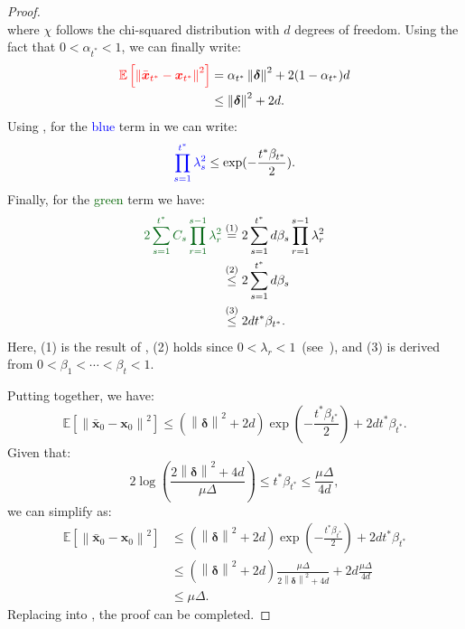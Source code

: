 \documentclass[conference]{IEEEtran}
\theoremstyle{definition}
\theoremstyle{remark}
\theoremstyle{proposition}
\newcommand{\norm}[1]{\left\lVert#1\right\rVert}
\begin{document}
\begin{proof}
$$    $$
    where $\chi$ follows the chi-squared distribution with $d$ degrees of freedom.
    Using the fact that $0 < \alpha_{t^{*}} < 1$, we can finally write:
    \begin{align}\label{eq:red_term_final}\nonumber
        \textcolor{red}{\mathbb{E}\left[\norm{\bar{\boldsymbol{x}}_{t^{*}}-\boldsymbol{x}_{t^{*}}}^2\right]}
        &= \alpha_{t^{*}}\norm{\boldsymbol{\delta}}^2 + 2 (1 - \alpha_{t^{*}})d \\ 
        &\leq \norm{\boldsymbol{\delta}}^2 + 2d.
    \end{align}
    Using , for the \textcolor{blue}{blue} term in  we can write:
    \begin{equation}\label{eq:blue_term}
        \textcolor{blue}{\prod_{s=1}^{t^{*}} \lambda_{s}^{2}} \leq \exp({-\frac{t^{*}\beta_{t^{*}}}{2}}).
    \end{equation}
    Finally, for the \textcolor{darkgreen}{green} term we have:
    \begin{align}\label{eq:green_term}\nonumber
        \textcolor{darkgreen}{2 \sum_{s=1}^{t^{*}}C_{s} \prod_{r=1}^{s-1}\lambda_{r}^{2}}
        &\stackrel{\mathrm{(1)}}{=} 2 \sum_{s=1}^{t^{*}}d\beta_s \prod_{r=1}^{s-1}\lambda_{r}^{2} \\\nonumber
        &\stackrel{\mathrm{(2)}}{\leq} 2 \sum_{s=1}^{t^{*}}d\beta_s\\
        &\stackrel{\mathrm{(3)}}{\leq} 2d t^{*}\beta_{t^{*}}.
    \end{align}
    Here, (1) is the result of , (2) holds since $0 < \lambda_r < 1$~(see~), and (3) is derived from ${0 < \beta_{1} < \cdots < \beta_{t} < 1}$.

    Putting  together, we have:
    \begin{equation}\label{eq:contraction_cumulative_simplified}
        \mathbb{E}\left[\norm{\bar{\boldsymbol{x}}_{0}-\boldsymbol{x}_{0}}^2\right] \leq \left(\norm{\boldsymbol{\delta}}^2 + 2d\right) \exp({-\frac{t^{*}\beta_{t^{*}}}{2}}) + 2d t^{*}\beta_{t^{*}}.
    \end{equation}
    Given that:
    $$2\log\left(\frac{2\norm{\boldsymbol{\delta}}^{2} + 4d}{\mu \Delta}\right) \leq t^{*} \beta_{t^{*}} \leq \frac{\mu \Delta}{4d},$$
    we can simplify  as:
    \begin{align}\label{eq:contraction_cumulative_final}\nonumber
        \mathbb{E}\left[\norm{\bar{\boldsymbol{x}}_{0}-\boldsymbol{x}_{0}}^2\right] &\leq \left(\norm{\boldsymbol{\delta}}^2 + 2d\right) \exp({-\frac{t^{*}\beta_{t^{*}}}{2}}) + 2d t^{*}\beta_{t^{*}}\\\nonumber
        &\leq \left(\norm{\boldsymbol{\delta}}^2 + 2d\right)\frac{\mu \Delta}{2\norm{\boldsymbol{\delta}}^{2} + 4d} + 2d \frac{\mu \Delta}{4d}\\
        &\leq \mu \Delta.
    \end{align}
    Replacing  into , the proof can be completed.
\end{proof}
\end{document}
